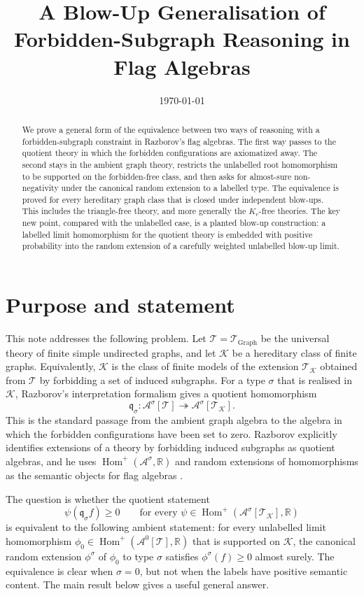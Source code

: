 \documentclass[11pt]{article}
\title{A Blow-Up Generalisation of Forbidden-Subgraph Reasoning in Flag Algebras}
\author{}
\date{\today}
\theoremstyle{definition}
\newcommand{\R}{\mathbb{R}}
\newcommand{\A}{\mathcal{A}}
\newcommand{\K}{\mathcal{K}}
\newcommand{\T}{\mathcal{T}}
\newcommand{\Homp}{\operatorname{Hom}^{+}}
\newcommand{\q}{\mathfrak q}
\begin{document}
\maketitle

\begin{abstract}
We prove a general form of the equivalence between two ways of reasoning with a
forbidden-subgraph constraint in Razborov's flag algebras.  The first way passes
to the quotient theory in which the forbidden configurations are axiomatized
away.  The second stays in the ambient graph theory, restricts the unlabelled
root homomorphism to be supported on the forbidden-free class, and then asks for
almost-sure non-negativity under the canonical random extension to a labelled
type.  The equivalence is proved for every hereditary graph class that is closed
under independent blow-ups.  This includes the triangle-free theory, and more
generally the $K_r$-free theories.  The key new point, compared with the
unlabelled case, is a planted blow-up construction: a labelled limit homomorphism
for the quotient theory is embedded with positive probability into the random
extension of a carefully weighted unlabelled blow-up limit.
\end{abstract}

\section{Purpose and statement}

This note addresses the following problem.  Let $\T=\T_{\mathrm{Graph}}$ be the
universal theory of finite simple undirected graphs, and let $\K$ be a hereditary
class of finite graphs.  Equivalently, $\K$ is the class of finite models of the
extension $\T_\K$ obtained from $\T$ by forbidding a set of induced subgraphs.
For a type $\sigma$ that is realised in $\K$, Razborov's interpretation
formalism gives a quotient homomorphism
\[
  \q_\sigma : \A^\sigma[\T] \twoheadrightarrow \A^\sigma[\T_\K].
\]
This is the standard passage from the ambient graph algebra to the algebra in
which the forbidden configurations have been set to zero.  Razborov explicitly
identifies extensions of a theory by forbidding induced subgraphs as quotient
algebras, and he uses $\Homp(\A^\sigma,\R)$ and random extensions of
homomorphisms as the semantic objects for flag algebras \cite[Sections 2.3.3,
3.1--3.2]{Razborov2007}.

The question is whether the quotient statement
\[
  \psi(\q_\sigma f)\ge 0
  \qquad\text{for every }\psi\in\Homp(\A^\sigma[\T_\K],\R)
\]
is equivalent to the following ambient statement: for every unlabelled limit
homomorphism $\phi_0\in\Homp(\A^0[\T],\R)$ that is supported on $\K$, the
canonical random extension $\phi^\sigma$ of $\phi_0$ to type $\sigma$ satisfies
$\phi^\sigma(f)\ge0$ almost surely.  The equivalence is clear when
$\sigma=0$, but not when the labels have positive semantic content.  The main
result below gives a useful general answer.
\end{document}
